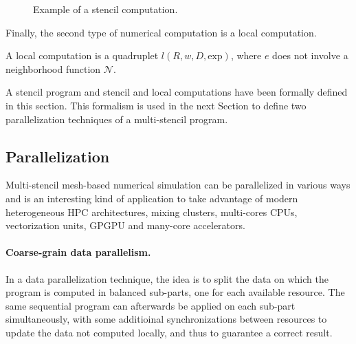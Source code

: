 \begin{figure}[!h]\begin{center}
  \caption{Example of a stencil computation.}
  \label{fig:ex}
\end{center}\end{figure}

Finally, the second type of numerical computation is a local computation.
\begin{mydef}
A local computation is a quadruplet $l(R,w,D,\text{exp})$, where $e$ does not involve a neighborhood function $\mathcal{N}$.
\end{mydef}

A stencil program and stencil and local computations have been formally defined in this section. This formalism is used in the next Section to define two parallelization techniques of a multi-stencil program.

\subsection{Parallelization}
\label{sect:parall}
Multi-stencil mesh-based numerical simulation can be parallelized in various ways and is an interesting kind of application to take advantage of modern heterogeneous HPC architectures, mixing clusters, multi-cores CPUs, vectorization units, GPGPU and many-core accelerators.

\paragraph{Coarse-grain data parallelism.} In a data parallelization technique, the idea is to split the data on which the program is computed in balanced sub-parts, one for each available resource. The same sequential program can afterwards be applied on each sub-part simultaneously, with some additioinal synchronizations between resources to update the data not computed locally, and thus to guarantee a correct result.

